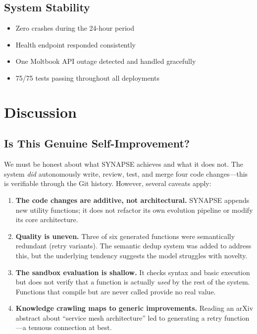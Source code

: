 \documentclass[11pt,a4paper]{article}
\begin{document}
\subsection{System Stability}

\begin{itemize}[noitemsep]
    \item Zero crashes during the 24-hour period
    \item Health endpoint responded consistently
    \item One Moltbook API outage detected and handled gracefully
    \item 75/75 tests passing throughout all deployments
\end{itemize}

\section{Discussion}
\label{sec:discussion}

\subsection{Is This Genuine Self-Improvement?}

We must be honest about what SYNAPSE achieves and what it does not. The system \textit{did} autonomously write, review, test, and merge four code changes---this is verifiable through the Git history. However, several caveats apply:

\begin{enumerate}[noitemsep]
    \item \textbf{The code changes are additive, not architectural.} SYNAPSE appends new utility functions; it does not refactor its own evolution pipeline or modify its core architecture.
    \item \textbf{Quality is uneven.} Three of six generated functions were semantically redundant (retry variants). The semantic dedup system was added to address this, but the underlying tendency suggests the model struggles with novelty.
    \item \textbf{The sandbox evaluation is shallow.} It checks syntax and basic execution but does not verify that a function is actually \textit{used} by the rest of the system. Functions that compile but are never called provide no real value.
    \item \textbf{Knowledge crawling maps to generic improvements.} Reading an arXiv abstract about ``service mesh architecture'' led to generating a retry function---a tenuous connection at best.
\end{enumerate}
\end{document}
